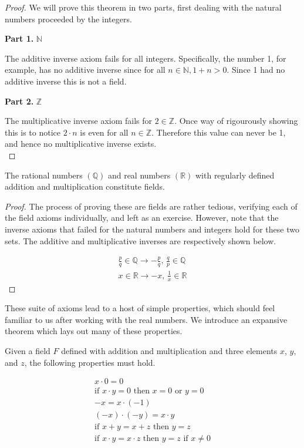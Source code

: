 \documentclass{report}
\newcommand{\header}[2]{\begin{flushright} \textbf{#1} #2 \end{flushright}}
\begin{document}
\begin{proof} 
	We will prove this theorem in two parts, first dealing with the natural numbers proceeded by the integers.
	\header{Part 1. }{$\mathbb{N}$}
	The additive inverse axiom fails for all integers. Specifically, the number 1, for example, has no additive inverse since for all $n \in \mathbb{N}, 1 + n > 0$. Since 1 had no additive inverse this is not a field.
	
	\header{Part 2. }{$\mathbb{Z}$}
	The multiplicative inverse axiom fails for $2 \in \mathbb{Z}$. Once way of rigourously showing this is to notice $2 \cdot n$ is even for all $n \in \mathbb{Z}$. Therefore this value can never be 1, and hence no multiplicative inverse exists. \\
\end{proof}
\vspace{\baselineskip}

\vspace{\baselineskip}
\begin{theorem}
	The rational numbers $(\mathbb{Q})$ and real numbers $(\mathbb{R})$ with regularly defined addition and multiplication constitute fields.
\end{theorem}

\begin{proof}
	The process of proving these are fields are rather tedious, verifying each of the field axioms individually, and left as an exercise. However, note that the inverse axioms that failed for the natural numbers and integers hold for these two sets. The additive and multiplicative inverses are respectively shown below.
	
	\begin{align*}
		\frac{p}{q} \in \mathbb{Q} \rightarrow -\frac{p}{q}, \, \frac{q}{p} \in \mathbb{Q} \\
		x \in \mathbb{R} \rightarrow -x, \, \frac{1}{x} \in \mathbb{R}
	\end{align*}
\end{proof}
\vspace{\baselineskip}

These suite of axioms lead to a host of simple properties, which should feel familiar to us after working with the real numbers. We introduce an expansive theorem which lays out many of these properties.

\vspace{\baselineskip}
\begin{theorem}
	Given a field $F$ defined with addition and multiplication and three elements $x$, $y$, and $z$, the following properties must hold.
	
	\begin{align}
		x \cdot 0 = 0 \\
		\text{if } x \cdot y = 0 \text{ then } x = 0 \text { or } y = 0 \\
		-x = x \cdot (-1) \\
		(-x) \cdot (-y) = x \cdot y \\
		\text{if } x + y = x + z \text{ then } y = z \\
		\text{if } x \cdot y = x \cdot z \text{ then } y = z \text { if } x \neq 0
	\end{align}
\end{theorem}
\end{document}

